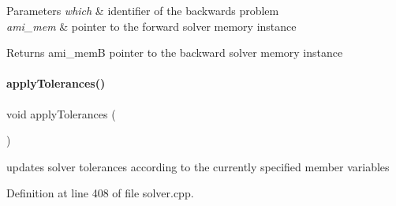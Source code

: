\begin{DoxyParams}{Parameters}
{\em which} & identifier of the backwards problem \\
\hline
{\em ami\+\_\+mem} & pointer to the forward solver memory instance \\
\hline
\end{DoxyParams}
\begin{DoxyReturn}{Returns}
ami\+\_\+memB pointer to the backward solver memory instance 
\end{DoxyReturn}
\mbox{\label{classamici_1_1_solver_a9819e5e5fa0d702721235eabd9e7c0e6}} 
\paragraph{\texorpdfstring{apply\+Tolerances()}{applyTolerances()}}
{\footnotesize\ttfamily void apply\+Tolerances (\begin{DoxyParamCaption}{ }\end{DoxyParamCaption})\hspace{0.3cm}{\ttfamily [protected]}}

updates solver tolerances according to the currently specified member variables 

Definition at line 408 of file solver.\+cpp.

